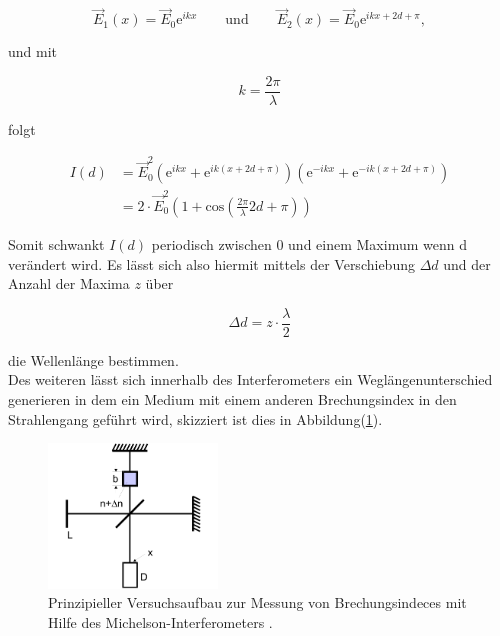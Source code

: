         \begin{equation}
            \vec{E}_1(x) = \vec{E}_0 \text{e}^{ikx} \quad \quad \text{und} \quad \quad \vec{E}_2(x) = \vec{E}_0 \text{e}^{ikx + 2d +\pi} ,
        \end{equation}

        \noindent und mit 

        \begin{equation*}
            k = \frac{2 \pi}{\lambda}
        \end{equation*}

        \noindent folgt

        \begin{align}
            I(d) &= \vec{E}_0^2 \left( \text{e}^{ikx} + \text{e}^{ik(x + 2d + \pi)} \right) \left( \text{e}^{-ikx} + \text{e}^{-ik(x + 2d + \pi)} \right) \\
                 &= 2 \cdot \vec{E}_0^2  \left( 1 + \text{cos} \left( \frac{2 \pi}{\lambda} 2 d + \pi \right) \right)
        \end{align}

        \noindent Somit schwankt $I(d)$ periodisch zwischen 0 und einem Maximum wenn d verändert wird. Es lässt sich also hiermit mittels der 
        Verschiebung $\Delta d$ und der Anzahl der Maxima $z$ über 

        \begin{equation}
            \Delta d = z \cdot \frac{\lambda}{2}
        \end{equation}

        \noindent die Wellenlänge bestimmen.\\

        Des weiteren lässt sich innerhalb des Interferometers ein Weglängenunterschied generieren in dem ein Medium mit einem anderen 
        Brechungsindex in den Strahlengang geführt wird, skizziert ist dies in Abbildung(\ref{img:5}).

        \begin{figure}[ht]
            \centering
            \includegraphics[width=0.4\textwidth]{latex/images/PrinOrd.PNG}
            \caption{Prinzipieller Versuchsaufbau zur Messung von Brechungsindeces mit Hilfe des Michelson-Interferometers \protect \cite{V401}.}
            \label{img:5}
        \end{figure}

